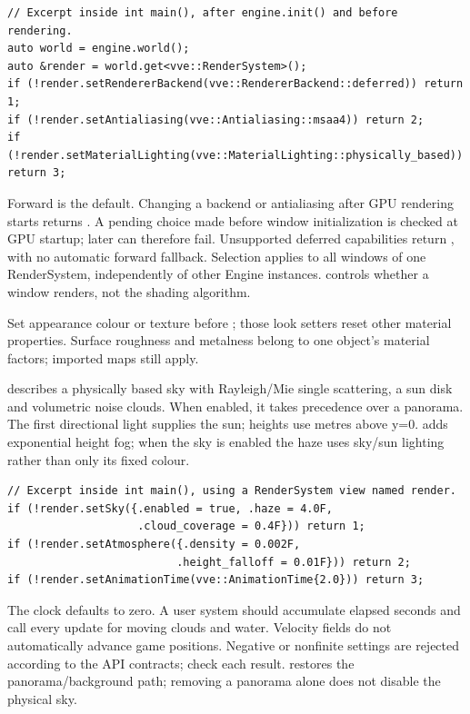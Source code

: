 \documentclass[11pt,a4paper]{article}
\begin{document}
\begin{lstlisting}
// Excerpt inside int main(), after engine.init() and before rendering.
auto world = engine.world();
auto &render = world.get<vve::RenderSystem>();
if (!render.setRendererBackend(vve::RendererBackend::deferred)) return 1;
if (!render.setAntialiasing(vve::Antialiasing::msaa4)) return 2;
if (!render.setMaterialLighting(vve::MaterialLighting::physically_based)) return 3;
\end{lstlisting}
Forward is the default. Changing a backend or antialiasing after GPU rendering starts returns . A pending choice made before window initialization is checked at GPU startup; later  can therefore fail. Unsupported deferred capabilities return , with no automatic forward fallback. Selection applies to all windows of one RenderSystem, independently of other Engine instances.  controls whether a window renders, not the shading algorithm.

Set appearance colour or texture before ; those look setters reset other material properties. Surface roughness and metalness belong to one object's material factors; imported maps still apply.


 describes a physically based sky with Rayleigh/Mie single scattering, a sun disk and volumetric noise clouds. When enabled, it takes precedence over a panorama. The first directional light supplies the sun; heights use metres above y=0.  adds exponential height fog; when the sky is enabled the haze uses sky/sun lighting rather than only its fixed colour.
\begin{lstlisting}
// Excerpt inside int main(), using a RenderSystem view named render.
if (!render.setSky({.enabled = true, .haze = 4.0F,
                    .cloud_coverage = 0.4F})) return 1;
if (!render.setAtmosphere({.density = 0.002F,
                          .height_falloff = 0.01F})) return 2;
if (!render.setAnimationTime(vve::AnimationTime{2.0})) return 3;
\end{lstlisting}
The clock defaults to zero. A user system should accumulate elapsed seconds and call  every update for moving clouds and water. Velocity fields do not automatically advance game positions. Negative or nonfinite settings are rejected according to the API contracts; check each result.  restores the panorama/background path; removing a panorama alone does not disable the physical sky.
\end{document}
